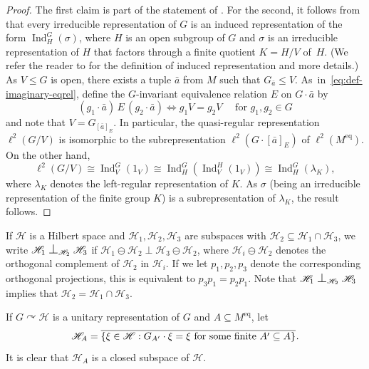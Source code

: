 \documentclass[JEP,XML,SOM,Unicode,published]{cedram}
\let\mathcal\mathscr
\let\actson\curvearrowright
\let\sub\subseteq
\theoremstyle{plain}
\theoremstyle{definition}
\newcommand{\cH}{\mathcal{H}}
\DeclareMathOperator{\Ind}{Ind}
\DeclarePairedDelimiter\set{\{}{\}}
\newcommand{\eq}{^{\mathrm{eq}}}
\newcommand{\cl}[2][]{\overline{#2}^{#1}}
\newcommand{\eqrel}[1]{\,#1\,}
\newcommand{\Perp}[1][]{\mathrel{
\mathop{
\scalebox{1.3}{\text{$\perp$}}
}\displaylimits_{#1}}}
\begin{document}
\begin{proof}
The first claim is part of the statement of \cite[Th.\,4.2]{Tsankov2012}. For the second, it follows from \cite[Th.\,4.2]{Tsankov2012} that every irreducible representation of $G$ is an induced representation of the form $\Ind_H^G(\sigma)$, where $H$ is an open subgroup of $G$ and $\sigma$ is an irreducible representation of $H$ that factors through a finite quotient $K = H/V$ of~$H$. (We refer the reader to \cite{Tsankov2012} for the definition of induced representation and more details.) As $V \leq G$ is open, there exists a tuple $\bar a$ from $M$ such that $G_{\bar a} \leq V$. As~in~\eqref{eq:def-imaginary-eqrel}, define the $G$-invariant equivalence relation $E$ on $G \cdot \bar a$ by
\begin{equation*}
(g_1 \cdot \bar a) \eqrel{E} (g_2 \cdot \bar a) \iff g_1V = g_2V \quad \text{ for } g_1, g_2 \in G
\end{equation*}
and note that $V = G_{[\bar a]_E}$. In particular, the quasi-regular representation $\ell^2(G/V)$ is isomorphic to the subrepresentation $\ell^2(G \cdot [\bar a]_E)$ of $\ell^2(M\eq)$. On the other hand,
\begin{equation*}
\ell^2(G/V) \cong \Ind_V^G(1_V) \cong \Ind_H^G(\Ind_V^H(1_V)) \cong \Ind_H^G(\lambda_K),
\end{equation*}
where $\lambda_K$ denotes the left-regular representation of $K$. As $\sigma$ (being an irreducible representation of the finite group $K$) is a subrepresentation of $\lambda_K$, the result follows.
\end{proof}

If $\cH$ is a Hilbert space and $\cH_1, \cH_2, \cH_3$ are subspaces with $\cH_2 \sub \cH_1 \cap \cH_3$, we write $\cH_1 \Perp[\cH_2] \cH_3$ if $\cH_1 \ominus \cH_2 \perp \cH_3 \ominus \cH_2$, where $\cH_i \ominus \cH_2$ denotes the orthogonal complement of $\cH_2$ in $\cH_i$.
If we let $p_1, p_2, p_3$ denote the corresponding orthogonal projections, this is equivalent to $p_3 p_1 = p_2 p_1$. Note that $\cH_1 \Perp[\cH_2] \cH_3$ implies that $\cH_2 = \cH_1 \cap \cH_3$.

If $G \actson \cH$ is a unitary representation of $G$ and $A \sub M\eq$, let
\begin{equation}
\label{eq:defHA}
\cH_A = \cl{\set{\xi \in \cH : G_{A'} \cdot \xi = \xi \text{ for some finite } A' \sub A}}.
\end{equation}
It is clear that $\cH_A$ is a closed subspace of $\cH$.
\end{document}
